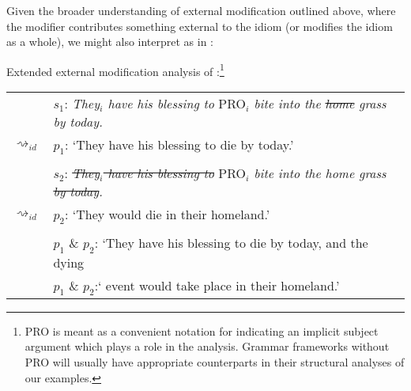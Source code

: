\documentclass[output=paper]{langsci/langscibook}
\begin{document}
Given the broader understanding of external modification outlined above, \linebreak where the modifier contributes something external to the idiom (or modifies the idiom as a whole), we might also interpret   as in : 

\ea \label{analysis2 home grass} 
Extended external modification analysis of :\footnote{PRO is meant as a convenient notation for indicating an implicit subject argument which plays a role in the analysis. Grammar frameworks without PRO will usually have appropriate counterparts in their structural analyses of our examples.} \\
\vspace{5pt}
\begin{tabular}{ll}
								& 	$s_{1}$: \hspace{4pt} \textit{They$_{i}$ have his blessing to} PRO$_{i}$ \textit{bite into the \sout{home} grass by today.} \\
$\rightsquigarrow_{id}$				&	$p_{1}$: \hspace{1pt} `They have his blessing to die by today.' \\
\vspace{-5pt} \\
								& 	$s_{2}$: \hspace{4pt} \textit{\sout{They$_{i}$ have his blessing to}} PRO$_{i}$ \textit{bite into the home grass \sout{by today}.} \\
$\rightsquigarrow_{id}$				&	$p_{2}$: \hspace{1pt} `They would die in their homeland.' \\
\vspace{-5pt} \\
								&	$p_{1}$ \& $p_{2}$: `They have his blessing to die by today, and the dying \\
								&	{\white $p_{1}$ \& $p_{2}$:`} event would take place in their homeland.' 
\end{tabular}
\z
\end{document}

